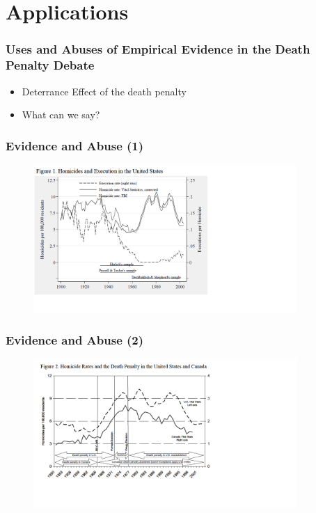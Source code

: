 \documentclass{beamer}
\newcommand{\1}{\mathbb{1}}
\begin{document}
\section{Applications}

\begin{frame}\frametitle{Uses and Abuses of Empirical Evidence in the Death Penalty Debate}
\begin{itemize}
 \item Deterrance Effect of the death penalty
 \item What can we say?
\end{itemize}
\end{frame}

\begin{frame}\frametitle{Evidence and Abuse (1)}
\begin{figure}
\includegraphics[width = 10cm]{plot/HomicidesExecution}
\end{figure}
\end{frame}

\begin{frame}\frametitle{Evidence and Abuse (2)}
\begin{figure}
\includegraphics[width = 10cm]{plot/USCanada}
\end{figure}
\end{frame}
\end{document}
